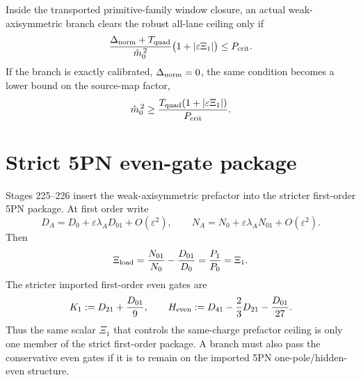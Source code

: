 \begin{theorem}
\label{thm:app-part07-actual-branch-ceiling}
Inside the transported primitive-family window closure, an actual weak-axisymmetric branch clears the robust all-lane ceiling only if
\begin{equation}
\label{eq:app-part07-thm-ceiling}
\frac{\Delta_{\rm norm}+T_{\rm quad}}{\hat m_0^{\,2}}
\bigl(1+|\varepsilon\Xi_1|\bigr)
\le P_{\rm crit}.
\end{equation}
If the branch is exactly calibrated, \(\Delta_{\rm norm}=0\), the same condition becomes a lower bound on the source-map factor,
\begin{equation}
\label{eq:app-part07-source-map-bound}
\hat m_0^{\,2}
\ge
\frac{T_{\rm quad}(1+|\varepsilon\Xi_1|)}{P_{\rm crit}}.
\end{equation}
\end{theorem}


\section{Strict 5PN even-gate package}
\label{sec:app-part07_same_charge_rigid_mouth:strict-5-pn-even-gate-package}

Stages 225--226 insert the weak-axisymmetric prefactor into the stricter first-order 5PN package.  At first order write
\begin{equation}
\label{eq:app-part07-first-order-d-n}
D_A=D_0+\varepsilon\lambda_A D_{01}+O(\varepsilon^2),
\qquad
N_A=N_0+\varepsilon\lambda_A N_{01}+O(\varepsilon^2).
\end{equation}
Then
\begin{equation}
\label{eq:app-part07-xi-load}
\Xi_{\rm load}
=
\frac{N_{01}}{N_0}-\frac{D_{01}}{D_0}
=
\frac{P_1}{P_0}
=
\Xi_1.
\end{equation}
The stricter imported first-order even gates are
\begin{equation}
\label{eq:app-part07-even-gates}
K_1:=D_{21}+\frac{D_{01}}{9},
\qquad
H_{\rm even}:=D_{41}-\frac23D_{21}-\frac{D_{01}}{27}.
\end{equation}
Thus the same scalar \(\Xi_1\) that controls the same-charge prefactor ceiling is only one member of the strict first-order package.  A branch must also pass the conservative even gates if it is to remain on the imported 5PN one-pole/hidden-even structure.

